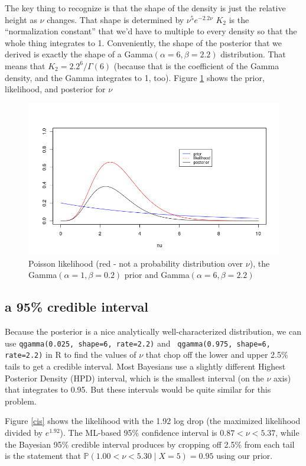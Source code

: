 \documentclass[11pt]{article}
\renewcommand{\Pr}{\mathbb{P}}
\begin{document}
The key thing to recognize is that the shape of the density is just
    the relative height as $\nu$ changes.
That shape is determined by $\nu^{5}e^{-2.2\nu}$
$K_2$ is the ``normalization constant'' that we'd have to multiple to 
    every density so that the whole thing integrates to 1.
Conveniently, the shape of the posterior that we derived is 
    exactly the shape of a Gamma$(\alpha=6, \beta=2.2)$ distribution.
That means that $K_2=2.2^6/\Gamma(6)$ (because that is the coefficient
of the Gamma density, and the Gamma integrates to 1, too).
Figure \ref{plp} shows the prior, likelihood, and posterior for $\nu$

\begin{figure}[h]
\hskip-1cm \includegraphics[scale=1]{images/poisson-gamma-conjugacy.png}
\caption{Poisson likelihood (red - not a probability distribution over $\nu$),
the Gamma$(\alpha=1, \beta=0.2)$ prior and Gamma$(\alpha=6, \beta=2.2)$}\label{plp}
\end{figure}

\subsection{a 95\% credible interval}
Because the posterior is a nice analytically well-characterized distribution,
we can use {\tt qgamma(0.025, shape=6, rate=2.2)} and {\tt
qgamma(0.975, shape=6, rate=2.2)}
in R to find the values of $\nu$ that chop off the lower 
and upper 2.5\% tails to get a
credible interval.
Most Bayesians use a slightly different Highest Posterior Density (HPD)
interval, which is the smallest interval (on the $\nu$ axis) that integrates
to 0.95.
But these intervals would be quite similar for this problem.

Figure \ref{cis} shows the likelihood with the 1.92 log drop (the maximized likelihood divided by $e^{1.92}$).
The ML-based 95\% confidence interval is $0.87 < \nu <5.37$, while
the Bayesian 95\% credible interval produces by cropping off 2.5\%
from each tail is the statement that $\Pr(1.00<\nu<5.30 \mid X=5) = 0.95$
using our prior.
\end{document}
